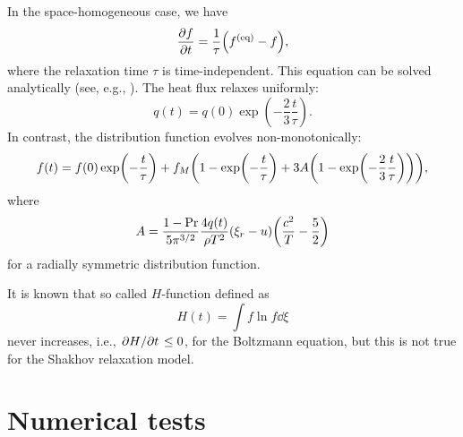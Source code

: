 \documentclass{article}
\newcommand{\equil}[1]{#1^\mathrm{(eq)}}
\begin{document}
In the space-homogeneous case, we have
\begin{equation}\label{eq:relax}
    \pdv{f}{t} = \frac1\tau\qty(\equil{f} - f),
\end{equation}
where the relaxation time $\tau$ is time-independent.
This equation can be solved analytically (see, e.g., \cite{titarev2004numerical}).
The heat flux relaxes uniformly:
\begin{equation}\label{eq:relax:q}
    q(t) = q(0)\exp(-\frac23\frac{t}\tau).
\end{equation}
In contrast, the distribution function evolves non-monotonically:
\begin{equation}\label{eq:relax:f}
    f(t) = f(0)\exp(-\frac{t}\tau) + f_M\qty(1 - \exp(-\frac{t}\tau) + 3A\qty(1-\exp(-\frac23\frac{t}\tau))),
\end{equation}
where
\begin{equation}\label{eq:relax:A}
    A = \frac{1-\Pr}{5\pi^{3/2}}\frac{4q(t)}{\rho T^2}(\xi_r - u)\qty(\frac{c^2}{T} - \frac52)
\end{equation}
for a radially symmetric distribution function.

It is known that so called $H$-function defined as
\begin{equation}\label{eq:relax:H}
    H(t) = \int f\ln{f}\dd\xi
\end{equation}
never increases, i.e., $\pdv*{H}{t}\leq0$, for the Boltzmann equation,
but this is not true for the Shakhov relaxation model.

\section{Numerical tests}
\end{document}
